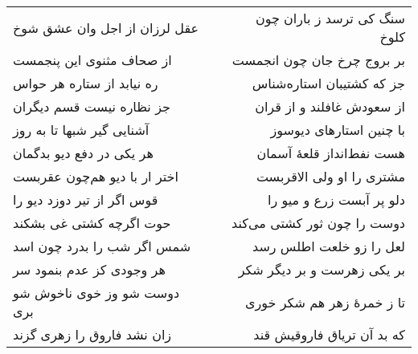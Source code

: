 \begin{center}
\begin{longtable}{l p{0.5cm} r}
عقل لرزان از اجل وان عشق شوخ
&&
سنگ کی ترسد ز باران چون کلوخ
\\
از صحاف مثنوی این پنجمست
&&
بر بروج چرخ جان چون انجمست
\\
ره نیابد از ستاره هر حواس
&&
جز که کشتیبان استاره‌شناس
\\
جز نظاره نیست قسم دیگران
&&
از سعودش غافلند و از قران
\\
آشنایی گیر شبها تا به روز
&&
با چنین استارهای دیوسوز
\\
هر یکی در دفع دیو بدگمان
&&
هست نفط‌انداز قلعهٔ آسمان
\\
اختر ار با دیو هم‌چون عقربست
&&
مشتری را او ولی الاقربست
\\
قوس اگر از تیر دوزد دیو را
&&
دلو پر آبست زرع و میو را
\\
حوت اگرچه کشتی غی بشکند
&&
دوست را چون ثور کشتی می‌کند
\\
شمس اگر شب را بدرد چون اسد
&&
لعل را زو خلعت اطلس رسد
\\
هر وجودی کز عدم بنمود سر
&&
بر یکی زهرست و بر دیگر شکر
\\
دوست شو وز خوی ناخوش شو بری
&&
تا ز خمرهٔ زهر هم شکر خوری
\\
زان نشد فاروق را زهری گزند
&&
که بد آن تریاق فاروقیش قند
\\
\end{longtable}
\end{center}
